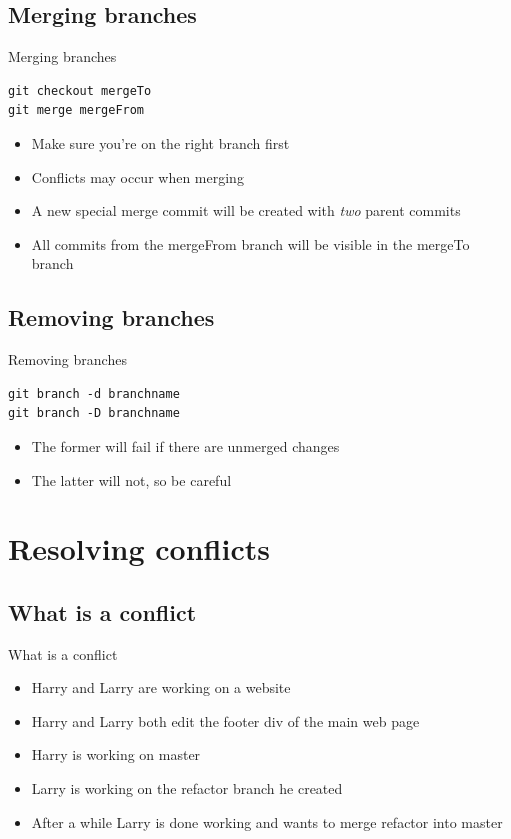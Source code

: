 \documentclass[10pt,a4paper]{beamer}
\begin{document}
\subsection{Merging branches}
\begin{frame}[fragile]{Merging branches}
\begin{verbatim}
git checkout mergeTo
git merge mergeFrom
\end{verbatim}
\begin{itemize}
\item Make sure you're on the right branch first
\item Conflicts may occur when merging
\item A new special merge commit will be created with \textit{two} parent commits
\item All commits from the mergeFrom branch will be visible in the mergeTo branch
\end{itemize}
\end{frame}

\subsection{Removing branches}
\begin{frame}[fragile]{Removing branches}
\begin{verbatim}
git branch -d branchname
git branch -D branchname
\end{verbatim}
\begin{itemize}
\item The former will fail if there are unmerged changes
\item The latter will not, so be careful
\end{itemize}
\end{frame}


\section{Resolving conflicts}

\subsection{What is a conflict}
\begin{frame}{What is a conflict}
\begin{itemize}
	\item Harry and Larry are working on a website
	\item Harry and Larry both edit the footer div of the main web page
	\item Harry is working on master
	\item Larry is working on the refactor branch he created
	\item After a while Larry is done working and wants to merge refactor into master
\end{itemize}
\end{frame}
\end{document}
